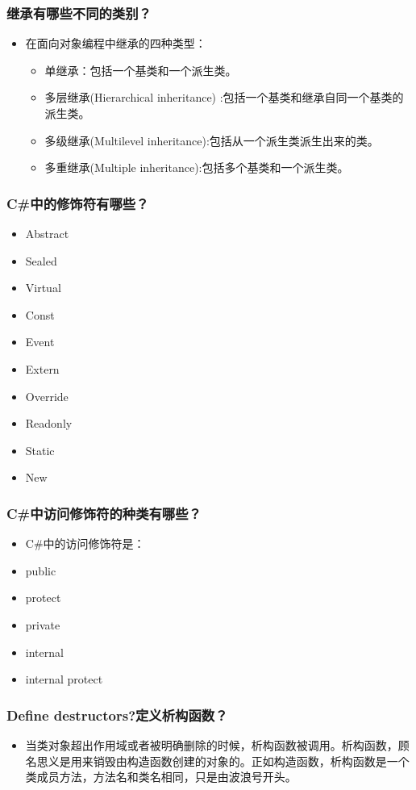 \documentclass[9pt, b5paper]{article}
\begin{document}
\subsubsection{继承有哪些不同的类别？}
\label{sec-1-2-59}
\begin{itemize}
\item 在面向对象编程中继承的四种类型：
\begin{itemize}
\item 单继承：包括一个基类和一个派生类。
\item 多层继承(Hierarchical inheritance) :包括一个基类和继承自同一个基类的派生类。
\item 多级继承(Multilevel inheritance):包括从一个派生类派生出来的类。
\item 多重继承(Multiple inheritance):包括多个基类和一个派生类。
\end{itemize}
\end{itemize}
\subsubsection{C\#中的修饰符有哪些？}
\label{sec-1-2-60}
\begin{itemize}
\item Abstract
\item Sealed
\item Virtual
\item Const
\item Event
\item Extern
\item Override
\item Readonly
\item Static
\item New
\end{itemize}
\subsubsection{C\#中访问修饰符的种类有哪些？}
\label{sec-1-2-61}
\begin{itemize}
\item C\#中的访问修饰符是：
\item public
\item protect
\item private
\item internal
\item internal protect
\end{itemize}
\subsubsection{Define destructors?定义析构函数？}
\label{sec-1-2-62}
\begin{itemize}
\item 当类对象超出作用域或者被明确删除的时候，析构函数被调用。析构函数，顾名思义是用来销毁由构造函数创建的对象的。正如构造函数，析构函数是一个类成员方法，方法名和类名相同，只是由波浪号开头。
\end{itemize}
\end{document}
